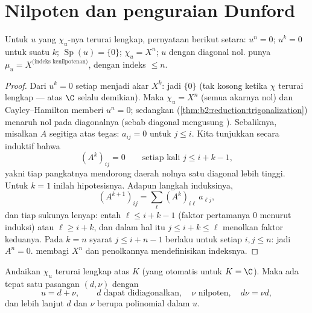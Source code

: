 \section{Nilpoten dan penguraian Dunford}

\begin{proposition}\label{prop:b2:reduction:nilpotent}
Untuk $u$ yang $\chi_u$-nya terurai lengkap, pernyataan berikut setara:
$u^n = 0$; $u^k = 0$ untuk suatu $k$; $\operatorname{Sp}(u) = \{0\}$;
$\chi_u = X^n$; $u$  dengan diagonal nol.  punya $\mu_u = X^{\text{(indeks kenilpotenan)}}$, dengan indeks
$\leq n$.
\end{proposition}

\begin{proof}
Dari $u^k = 0$ setiap  menjadi akar $X^k$: jadi 
$\{0\}$ (tak kosong ketika $\chi$ terurai lengkap --- atas $\C$ selalu
demikian). Maka $\chi_u = X^n$ (semua akarnya nol) dan Cayley--Hamilton
memberi $u^n = 0$; sedangkan 
(\cref{thm:b2:reduction:trigonalization}) menaruh nol pada diagonalnya
(sebab diagonal mengusung ). Sebaliknya, misalkan $A$
segitiga atas tegas: $a_{ij} = 0$ untuk $j \leq i$. Kita tunjukkan
secara induktif bahwa
\[
(A^k)_{ij} = 0 \qquad \text{setiap kali } j \leq i + k - 1,
\]
yakni tiap pangkatnya mendorong daerah nolnya satu diagonal lebih
tinggi. Untuk $k = 1$ inilah hipotesisnya. Adapun langkah induksinya,
\[
(A^{k+1})_{ij} = \sum_{\ell} (A^k)_{i\ell}\,a_{\ell j} ,
\]
dan tiap sukunya lenyap: entah $\ell \leq i + k - 1$ (faktor pertamanya
$0$ menurut induksi) atau $\ell \geq i + k$, dan dalam hal itu
$j \leq i + k \leq \ell$ menolkan faktor keduanya. Pada $k = n$ syarat
$j \leq i + n - 1$ berlaku untuk setiap $i, j \leq n$: jadi $A^n =
0$.  membagi $X^n$ dan penolkannya
mendefinisikan indeksnya.
\end{proof}

\begin{theorem}\label{thm:b2:reduction:dunford}
Andaikan $\chi_u$ terurai lengkap atas $K$ (yang otomatis untuk $K =
\C$). Maka ada tepat satu pasangan $(d, \nu)$ dengan
\[
u = d + \nu, \qquad d \text{ dapat didiagonalkan}, \quad \nu
\text{ nilpoten}, \quad d\nu = \nu d ,
\]
dan lebih lanjut $d$ dan $\nu$ berupa polinomial dalam
$u$.
\end{theorem}

